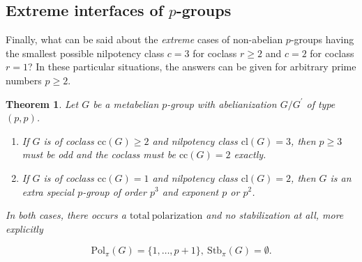 \documentclass{amsart}
\newtheorem{theorem}{Theorem}[section]
\theoremstyle{definition}
\numberwithin{equation}{section}
\begin{document}
\subsection{Extreme interfaces of \(p\)-groups}
\label{ss:Extreme}

Finally,
what can be said about the \textit{extreme} cases
of non-abelian \(p\)-groups having the smallest possible nilpotency class
\(c=3\) for coclass \(r\ge 2\) and
\(c=2\) for coclass \(r=1\)?
In these particular situations,
the answers can be given for arbitrary prime numbers \(p\ge 2\).

\begin{theorem}
\label{thm:Extreme}
Let \(G\) be a metabelian \(p\)-group with abelianization \(G/G^\prime\) of type \((p,p)\).

\begin{enumerate}

\item
If \(G\) is of coclass \(\mathrm{cc}(G)\ge 2\) and nilpotency class \(\mathrm{cl}(G)=3\),
then \(p\ge 3\) must be odd and the coclass must be \(\mathrm{cc}(G)=2\) exactly.

\item
If \(G\) is of coclass \(\mathrm{cc}(G)=1\) and nilpotency class \(\mathrm{cl}(G)=2\),
then \(G\) is an extra special \(p\)-group of order \(p^3\) and exponent \(p\) or \(p^2\).

\end{enumerate}

\noindent
In both cases,
there occurs a \(\mathrm{total\ polarization}\) and no stabilization at all,
more explicitly

\begin{equation}
\label{eqn:TotPol}
\mathrm{Pol}_{\pi}(G)=\lbrace 1,\ldots,p+1\rbrace,\ \mathrm{Stb}_{\pi}(G)=\emptyset.
\end{equation}

\end{theorem}
\end{document}
